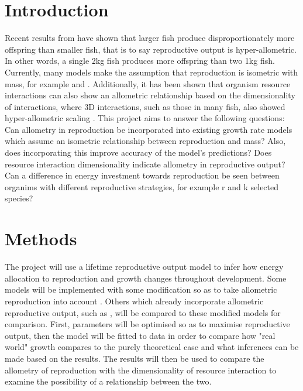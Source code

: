 \section*{Introduction}
Recent results from \cite{Barneche2018} have shown that larger fish produce disproportionately more offspring than smaller fish, that is to say reproductive output is hyper-allometric.  In other words, a single 2kg fish produces more offspring than two 1kg fish.  Currently, many models make the assumption that reproduction is isometric with mass, for example \cite{Charnov2001} and \cite{West2001}.  Additionally, it has been shown that organism resource interactions can also show an allometric relationship based on the dimensionality of interactions, where 3D interactions, such as those in many fish, also showed hyper-allometric scaling \citep{Pawar2012}. 
\newline
This project aims to answer the following questions:
\newline
Can allometry in reproduction be incorporated into existing growth rate models which assume an isometric relationship between reproduction and mass? Also, does incorporating this improve accuracy of the model's predictions?
\newline
Does resource interaction dimensionality indicate allometry in reproductive output?
\newline
Can a difference in energy investment towards reproduction be seen between organims with different reproductive strategies, for example r and k selected species?

\section*{Methods}
The project will use a lifetime reproductive output model to infer how energy allocation to reproduction and growth changes throughout development.  Some models will be implemented with some modification so as to take allometric reproduction into account \citep{Charnov2001, West2001}.  Others which already incorporate allometric reproductive output, such as \cite{Burger2019}, will be compared to these modified models for comparison. First, parameters will be optimised so as to maximise reproductive output, then the model will be fitted to data in order to compare how "real world" growth compares to the purely theoretical case and what inferences can be made based on the results.
\newline
The results will then be used to compare the allometry of reproduction with the dimensionality of resource interaction to examine the possibility of a relationship between the two.  

